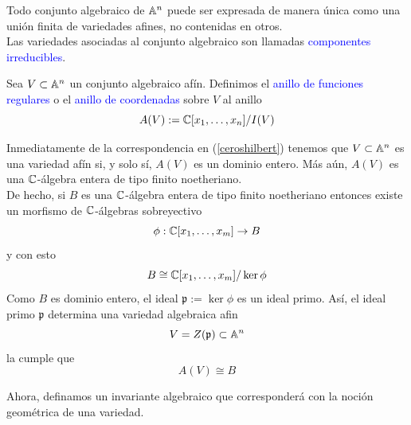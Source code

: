     \begin{propo}\label{componentesirreducibles}
        Todo conjunto algebraico de $\mathbb{A}^n$ puede ser expresada de manera única como una unión finita de variedades afines, no contenidas en otros.\\
        Las variedades asociadas al conjunto algebraico son llamadas \textcolor{blue}{componentes irreducibles}. 
    \end{propo}

    
    \begin{definition}
        Sea $V\subset\mathbb{A}^n$ un conjunto algebraico afín. Definimos el \textcolor{blue}{anillo de funciones regulares} o el \textcolor{blue}{anillo de coordenadas} sobre $V$ al anillo
        \begin{equation*}
            A(V):=\mathbb{C}[x_1,\dots,x_n]/I(V)
        \end{equation*}
    \end{definition}

    \begin{remark}
        Inmediatamente de la correspondencia en (\ref{ceroshilbert}) tenemos que $V\subset \mathbb{A}^n$ es una variedad afín si, y solo sí, $A(V)$ es un dominio entero. Más aún, $A(V)$ es una $\mathbb{C}$-álgebra entera de tipo finito noetheriano.\\ 
        De hecho, si $B$ es una $\mathbb{C}$-álgebra entera de tipo finito noetheriano entonces existe un morfismo de $\mathbb{C}$-álgebras sobreyectivo
        \begin{equation*}
            \phi:\mathbb{C}[x_1,\dots,x_m]\to B
        \end{equation*}
        y con esto
        \begin{equation*}
            B\cong\mathbb{C}[x_1,\dots,x_m]/\ker\phi 
        \end{equation*}
        Como $B$ es dominio entero, el ideal $\mathfrak{p}:=\ker\phi$ es un ideal primo. Así, el ideal primo $\mathfrak{p}$ determina una variedad algebraica afin
        \begin{equation*}
            V=Z(\mathfrak{p})\subset\mathbb{A}^n
        \end{equation*}
        la cumple que
        \begin{equation*}
            A(V)\cong B
        \end{equation*}
        \end{remark}

    Ahora, definamos un invariante algebraico que corresponderá con la noción geométrica de una variedad.
    
